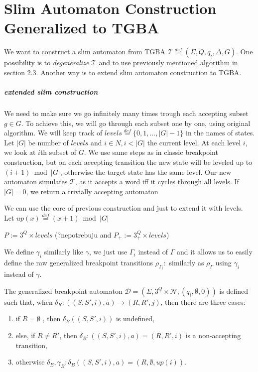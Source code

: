 \documentclass[
	digital
nolof, nolot
]{fithesis3}
\newcommand{\cD}{\mathcal{D}}
\newcommand{\cN}{\mathcal{N}}
\newcommand{\cT}{\mathcal{T}}
\newcommand{\eqdef}{\overset{def}{=}}
\begin{document}
			
			\chapter{Slim Automaton Construction Generalized to TGBA}
			We want to construct a slim automaton from TGBA $\cT\eqdef(\Sigma, Q, q_i, \Delta, G)$.
			One possibility is to \emph{degeneralize} $\cT$ and to use previously mentioned algorithm in section 2.3. Another way is to extend slim automaton construction to TGBA.
			\paragraph{extended slim construction}
			We need to make sure we go infinitely many times trough each accepting subset $g \in G$. To achieve this, we will go through each subset one by one, using original algorithm. We will keep track of $levels\eqdef\{0,1,\ldots,|G|-1\}$ in the names of states. Let $|G|$ be number of $levels$ and $i \in N, i<|G|$ the current level. At each level $i$, we look at $i$th subset of $G$. We use same steps as in classic breakpoint construction, but on each accepting transition the new state will be leveled up to $(i+1)\bmod|G|$, otherwise the target state has the same level. Our new automaton simulates $\cT$, as it accepts a word iff it cycles through all levels. If $|G|=0$, we return a trivially accepting automaton
			
			We can use the core of previous construction and just to extend it with levels. Let
			$up(x)\eqdef(x+1)\bmod|G|$ 
			
			
			$P := 3^Q \times levels$ (?nepotrebuju and $P_+ := 3^Q_+ \times levels$)
			
			
			We define $\gamma_i$ similarly like $\gamma$, we just use $\Gamma_i$ instead of $\Gamma$ and it allows us to easily define the raw generalized breakpoint transitions
			$\rho_{\Gamma_{i}}\colon$ similarly as $\rho_\Gamma$ using $\gamma_i$ instead of $\gamma$.
			
			The generalized breakpoint automaton $\cD=(\Sigma, 3^Q\times\cN, ({q_i},\emptyset, 0))$ is defined such that, when $\delta_R\colon((S, S', i), a) \rightarrow (R, R', j)$, then there are three cases:
			\begin{enumerate}
				\item if $R=\emptyset$ , then $\delta_B((S,S',i))$ is undefined,
				\item else, if $R \neq R'$, then $\delta_B\colon((S,S',i),a) = (R,R',i)$ is a non-accepting transition,
				\item otherwise $\delta_B, \gamma_B \colon \delta_B((S,S',i),a) = (R, \emptyset, up(i))$.
			\end{enumerate}
		
\end{document}
